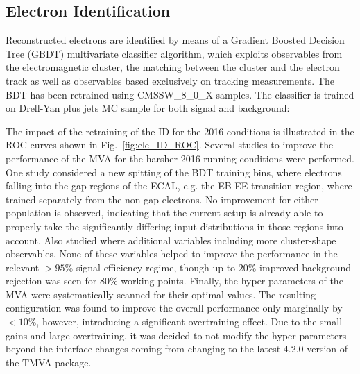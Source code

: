 \subsection{Electron Identification}
\label{sec:eleID}

Reconstructed electrons are identified by means of a Gradient Boosted Decision Tree (GBDT) multivariate classifier algorithm, which exploits observables from the electromagnetic cluster, the matching between the cluster and the electron track as well as observables based exclusively on tracking measurements. 
The BDT has been retrained using CMSSW\_8\_0\_X samples. The classifier is trained on Drell-Yan plus jets MC sample for both signal and background: 


The impact of the retraining of the ID for the 2016 conditions is illustrated in the ROC curves shown in Fig.~\ref{fig:ele_ID_ROC}. Several studies to improve the performance of the MVA for the harsher 2016 running conditions were performed. 
One study considered a new spitting of the BDT training bins, where electrons falling into the gap regions of the ECAL, e.g. the EB-EE transition region, where trained separately from the non-gap electrons. 
No improvement for either population is observed, indicating that the current setup is already able to properly take the significantly differing input distributions in those regions into account. 
Also studied where additional variables including more cluster-shape observables. 
None of these variables helped to improve the performance in the relevant $>95\%$ signal efficiency regime, though up to $20\%$ improved background rejection was seen for $80\%$ working points. 
Finally, the hyper-parameters of the MVA were systematically scanned for their optimal values. The resulting configuration was found to improve the overall performance only marginally by $<10\%$, however, introducing a significant overtraining effect. 
Due to the small gains and large overtraining, it was decided to not modify the hyper-parameters beyond the interface changes coming from changing to the latest 4.2.0 version of the TMVA package.

